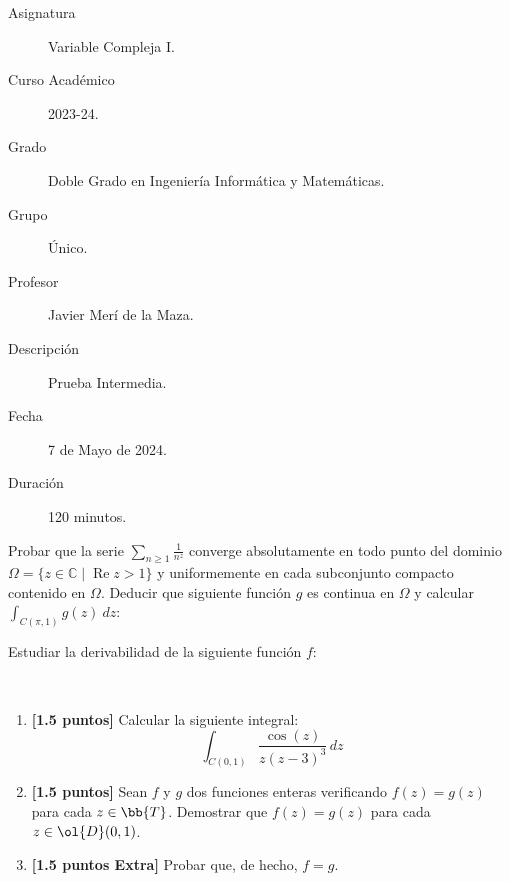 \documentclass[12pt]{article}
\renewcommand{\Re}{\operatorname{Re}} %
\begin{document}

    
    

    \begin{description}
        \item[Asignatura] Variable Compleja I.
        \item[Curso Académico] 2023-24.
        \item[Grado] Doble Grado en Ingeniería Informática y Matemáticas.
        \item[Grupo] Único.
        \item[Profesor] Javier Merí de la Maza.
        \item[Descripción] Prueba Intermedia.
        \item[Fecha] 7 de Mayo de 2024.
        \item[Duración] 120 minutos.
    
    \end{description}
    \newpage

    \begin{ejercicio}[4 puntos]
        Probar que la serie $\displaystyle \sum_{n\geq 1} \frac{1}{n^z}$ converge absolutamente en todo punto del dominio $\Omega = \{ z \in \mathbb{C} \mid \Re z > 1 \}$ y uniformemente en cada subconjunto compacto contenido en $\Omega$. Deducir que siguiente función $g$ es continua en $\Omega$ y calcular $\displaystyle \int_{C(\pi,1)} g(z) \ dz$:
    \end{ejercicio}

    \begin{ejercicio}[3 puntos]
        Estudiar la derivabilidad de la siguiente función $f$:
    \end{ejercicio}

    \begin{ejercicio}[3 puntos]~
        \begin{enumerate}
            \item \textbf{[1.5 puntos]} Calcular la siguiente integral:
            \begin{equation*}
                \int_{C(0,1)} \frac{\cos(z)}{z(z-3)^3} \, dz
            \end{equation*}
            \item \textbf{[1.5 puntos]} Sean $f$ y $g$ dos funciones enteras verificando $f(z) = g(z)$ para cada $z \in \bb{T}$. Demostrar que $f(z) = g(z)$ para cada $z \in \ol{D}(0, 1)$. 
            \item \textbf{[1.5 puntos Extra]} Probar que, de hecho, $f = g$.
        \end{enumerate}
    \end{ejercicio}
\end{document}
